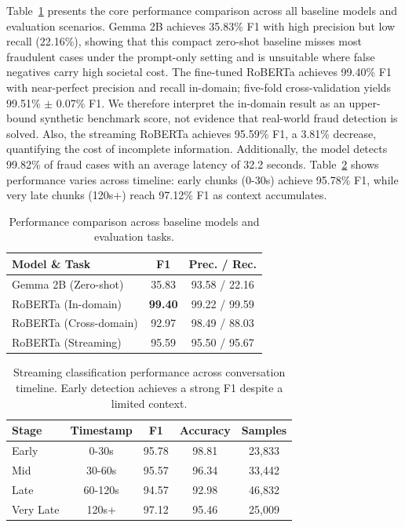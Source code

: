 \documentclass{article}
\newcommand{\crchange}[1]{{\color{blue}#1}}
\begin{document}
Table~\ref{tab:main_results} presents the core performance comparison across all baseline models and evaluation scenarios. \crchange{Gemma 2B achieves 35.83\% F1 with high precision but low recall (22.16\%), showing that this compact zero-shot baseline misses most fraudulent cases under the prompt-only setting and is unsuitable where false negatives carry high societal cost.}
\crchange{The fine-tuned RoBERTa achieves 99.40\% F1 with near-perfect precision and recall in-domain; five-fold cross-validation yields 99.51\% $\pm$ 0.07\% F1. We therefore interpret the in-domain result as an upper-bound synthetic benchmark score, not evidence that real-world fraud detection is solved.}
Also, the streaming RoBERTa achieves 95.59\% F1, a 3.81\% decrease, quantifying the cost of incomplete information. Additionally, the model detects 99.82\% of fraud cases with an average latency of 32.2 seconds. Table~\ref{tab:streaming_timeline} shows performance varies across timeline: early chunks (0-30s) achieve 95.78\% F1, while very late chunks (120s+) reach 97.12\% F1 as context accumulates.

\begin{table}[t]
\centering
\caption{Performance comparison across baseline models and evaluation tasks.}
\label{tab:main_results}
\begin{tabular}{@{}lcc@{}}
\toprule
Model \& Task & F1 & Prec. / Rec. \\ \midrule
Gemma 2B (Zero-shot) & 35.83 & 93.58 / 22.16 \\
\midrule
RoBERTa (In-domain) & \textbf{99.40} & 99.22 / 99.59 \\
RoBERTa (Cross-domain) & 92.97 & 98.49 / 88.03 \\
RoBERTa (Streaming) & 95.59 & 95.50 / 95.67 \\
\bottomrule
\end{tabular}
\end{table}


\begin{table}[t]
\centering
\caption{Streaming classification performance across conversation timeline. Early detection achieves a strong F1 despite a limited context.}
\label{tab:streaming_timeline}
\begin{tabular}{@{}lcccc@{}}
\toprule
Stage & Timestamp & F1 & Accuracy & Samples \\ \midrule
Early & 0-30s & 95.78 & 98.81 & 23,833 \\
Mid & 30-60s & 95.57 & 96.34 & 33,442 \\
Late & 60-120s & 94.57 & 92.98 & 46,832 \\
Very Late & 120s+ & 97.12 & 95.46 & 25,009 \\
\bottomrule
\end{tabular}
\end{table}
\end{document}
